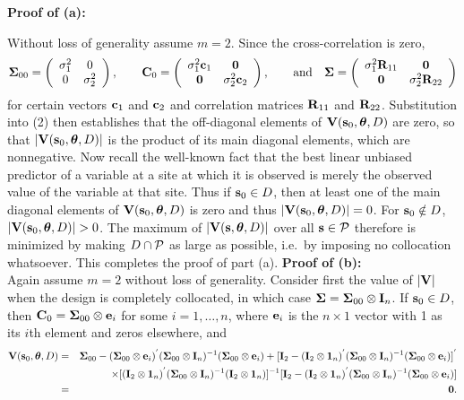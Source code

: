 \documentclass[12pt]{article}
\def\btheta{\mbox{\boldmath$\theta$}}
\def\bSigma{\mbox{\boldmath$\Sigma$}}
\begin{document}
\noindent \textbf{Proof of (a):}\par
Without loss of generality assume $m=2$.  Since the cross-correlation is zero,
\[ \bSigma_{00}=\left(\begin{array}{cc}
\sigma_1^2 & 0 \\
0 & \sigma_{2}^2 \end{array} \right),\quad\quad
{\bf C}_0=\left(\begin{array}{cc}
\sigma_1^2{\bf c}_1 & {\bf 0} \\
{\bf 0} & \sigma_{2}^2{\bf c}_2 \end{array} \right),\quad\quad
\mbox{and}\quad\bSigma=\left(\begin{array}{cc}
\sigma_1^2{\bf R}_{11} & {\bf 0} \\
{\bf 0} & \sigma_{2}^2{\bf R}_{22} \end{array} \right)
\]
for certain vectors ${\bf c}_1$ and ${\bf c}_2$ and correlation matrices ${\bf R}_{11}$ and ${\bf R}_{22}$.
Substitution into (2) then establishes that the off-diagonal elements of ${\bf V}({\bf s}_0,\btheta,D)$ are zero, so that $|{\bf V}({\bf s}_0,\btheta,D)|$ is the product of its main diagonal elements, which are nonnegative.  Now recall the well-known fact that the best linear unbiased predictor of a variable at a site at which it is observed is merely the observed value of the variable at that site.  Thus if ${\bf s}_0\in D$, then at least one of the main diagonal elements of ${\bf V}({\bf s}_0,\btheta,D)$ is zero and thus $|{\bf V}({\bf s}_0,\btheta,D)|=0$.  For ${\bf s}_0\notin D$, $|{\bf V}({\bf s}_0,\btheta,D)|>0$.  The maximum of $|{\bf V}({\bf s},\btheta,D)|$ over all ${\bf s}\in{\cal P}$ therefore is minimized by making $D\cap{\cal P}$ as large as possible, i.e.\ by imposing no collocation whatsoever.  This completes the proof of part (a).
\vspace{.2in}
\newline
\noindent\textbf{Proof of (b):}\\
Again assume $m=2$ without loss of generality.  Consider first the value of $|{\bf V}|$ when the design is completely collocated, in which case $\bSigma=\bSigma_{00}\otimes{\bf I}_n$.  If ${\bf s}_0\in D$, then ${\bf C}_0=\bSigma_{00}\otimes{\bf e}_i$ for some $i=1,\ldots,n$, where ${\bf e}_i$ is the $n\times 1$ vector with 1 as its $i$th element and zeros elsewhere,
and
\begin{eqnarray*}
{\bf V}({\bf s}_0,\btheta,D) & = & \bSigma_{00}-(\bSigma_{00}\otimes{\bf e}_i)^{'}(\bSigma_{00}\otimes{\bf I}_n)^{-1}(\bSigma_{00}
\otimes{\bf e}_i)+[{\bf I}_2-({\bf I}_2\otimes {\bf 1}_n)^{'}(\bSigma_{00}\otimes{\bf I}_n)^{-1}(\bSigma_{00}
\otimes{\bf e}_i)]^{'} \\
& & \times [({\bf I}_2\otimes{\bf 1}_n)^{'}(\bSigma_{00}\otimes{\bf I}_n)^{-1}({\bf I}_2\otimes {\bf 1}_n)]^{-1}[{\bf I}_2-({\bf I}_2\otimes {\bf 1}_n)^{'}(\bSigma_{00}\otimes{\bf I}_n)^{-1}(\bSigma_{00}
\otimes{\bf e}_i)] \\
& = & {\bf 0}.
\end{eqnarray*}
\end{document}
